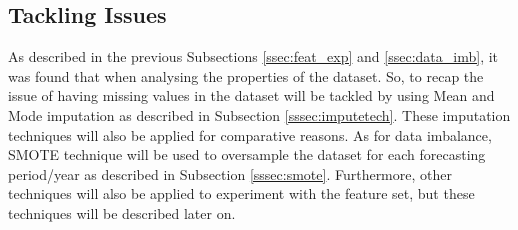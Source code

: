 \subsection{Tackling Issues}\label{ssec:tackleissues}
As described in the previous Subsections \ref{ssec:feat_exp} and \ref{ssec:data_imb}, it was found that when analysing the properties of the dataset. So, to recap the issue of having missing values in the dataset will be tackled by using Mean and Mode imputation as described in Subsection \ref{sssec:imputetech}. These imputation techniques will also be applied for comparative reasons. As for data imbalance, SMOTE technique will be used to oversample the dataset for each forecasting period/year as described in Subsection \ref{sssec:smote}. Furthermore, other techniques will also be applied to experiment with the feature set, but these techniques will be described later on. 
